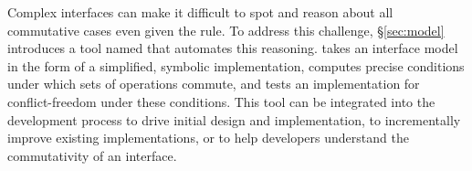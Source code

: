 \begin{comment}
Applying the rule to real-world software systems poses two challenges.
%
First, the usual definition of commutativity is limited in ways that
restricts its applicability to complex, stateful interfaces.  To
address this challenge, \S\ref{sec:rule} defines a novel form of
commutativity named \emph{\SRI\ commutativity}.
%
\SRI commutativity is \emph{state-dependent}: rather than requiring
operations to be order-invariant in all states, \SRI\ commutativity
allows developers to reason not only about specific arguments for
which operations commute, but also in which system states they
commute, exposing more opportunities to apply the rule.  The above
example from POSIX shows why this is important: creating files with
different names does \emph{not} commute if the names are symlinks to
the same name, but this one case does not limit the rule's
applicability to other file system states.
%
\SRI\ commutativity is \emph{region-oriented}: rather than applying to just
two operations, \SRI\ commutativity applies to a region of an execution
trace, which may contain several operations, again exposing more
opportunities to apply the rule.
%
Finally, it is \emph{interface-based}: rather than requiring all
operation orders to produce identical internal states, it requires the
resulting states to be indistinguishable via the interface, allowing
developers to reason about commutativity independent of any specific
implementation.

\XXX[AC][Spread the above new terminology to the rest of the paper.]
\end{comment}

Complex interfaces can make it difficult to spot and reason about all
commutative cases even given the rule.  To address this challenge,
\S\ref{sec:model} introduces a tool named \tool that automates this
reasoning.  \tool takes an interface model
in the form of a simplified, symbolic implementation, computes precise
conditions under which sets of operations commute, and tests an
implementation for conflict-freedom under these conditions.  This tool can be
integrated into the development process to drive initial design and
implementation, to incrementally improve existing implementations, or to
help developers understand the commutativity of an interface.
%

